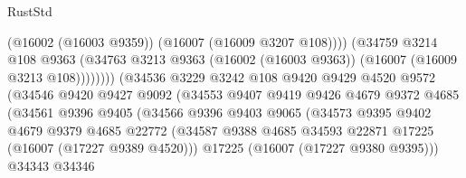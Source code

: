 \begin{lexlean}{RustStd}
\begin{coremodule}
                                          (@16002 (@16003 @9359))
                                          (@16007 (@16009 @3207 @108))))
                                      (@34759
                                        @3214
                                        @108
                                        @9363
                                        (@34763
                                          @3213
                                          @9363
                                          (@16002 (@16003 @9363))
                                          (@16007 (@16009 @3213 @108))))))))
                              (@34536
                                @3229
                                @3242
                                @108
                                @9420
                                @9429
                                @4520
                                @9572
                                (@34546
                                  @9420
                                  @9427
                                  @9092
                                  (@34553
                                    @9407
                                    @9419
                                    @9426
                                    @4679
                                    @9372
                                    @4685
                                    (@34561
                                      @9396
                                      @9405
                                      (@34566
                                        @9396
                                        @9403
                                        @9065
                                        (@34573
                                          @9395
                                          @9402
                                          @4679
                                          @9379
                                          @4685
                                          @22772
                                          (@34587
                                            @9388
                                            @4685
                                            @34593
                                            @22871
                                            @17225
                                            (@16007 (@17227 @9389 @4520)))
                                          @17225
                                          (@16007 (@17227 @9380 @9395)))
                                        @34343
                                        @34346

\end{coremodule}
\end{lexlean}
